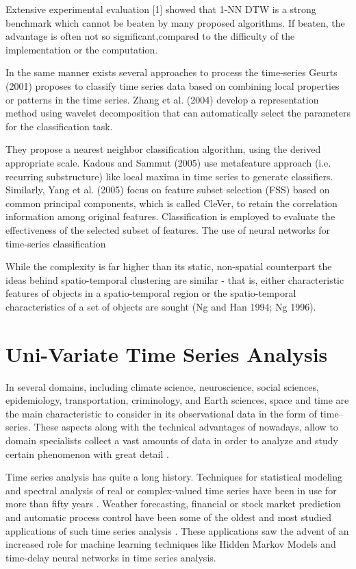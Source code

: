 Extensive  experimental  evaluation  [1] showed  that  1-NN  DTW  is  a  strong  benchmark  which  cannot  be  beaten  by many proposed algorithms. If beaten, the advantage is often not so significant,compared to the difficulty of the implementation or the computation.

In the same manner exists several approaches to process the time-series Geurts (2001) proposes to classify time series data based on combining local properties or patterns in the time series. Zhang et al. (2004) develop a representation method using wavelet decomposition that can automatically select the parameters for the classification task. 

They propose a nearest neighbor classification algorithm, using the derived appropriate scale. Kadous and Sammut (2005) use metafeature approach (i.e. recurring substructure) like local maxima in time series to generate classifiers. Similarly, Yang et al. (2005) focus on feature subset selection (FSS) based on common principal components, which is called CleVer, to retain the correlation information among original features. Classification is employed to evaluate the effectiveness of the selected subset of features. 
The use of neural networks for time-series classification

 While the complexity is far higher than its static, non-spatial counterpart the ideas behind spatio-temporal clustering are similar - that is, either characteristic features of objects in a spatio-temporal region or the spatio-temporal characteristics of a set of objects are sought (Ng and Han 1994; Ng 1996).

\section{Uni-Variate Time Series Analysis}
\label{Sec:TSAnalysis}

In several domains, including climate science, neuroscience, social sciences, epidemiology, transportation, criminology, and Earth sciences, space and time are the main characteristic to consider in its observational data in the form of time--series. These aspects along with the technical advantages of nowadays, allow to domain specialists collect a vast amounts of data in order to analyze and study certain phenomenon with great detail \cite{}. 

Time series analysis has quite a long history. Techniques for statistical modeling and spectral analysis of real or complex-valued time series have been in use for more than fifty years \cite{Hyndman2006, Chatfield2019}. Weather forecasting, financial or stock market prediction and automatic process control have been some of the oldest and most studied applications of such time series analysis \cite{Box1976}. These applications saw the advent of an increased role for machine learning techniques like Hidden Markov Models and time-delay neural networks in time series analysis.

